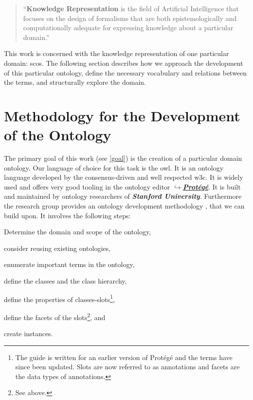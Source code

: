 \documentclass[a4paper, DIV=13, BCOR=0cm]{scrbook}
\newcommand{\pn}[1]{\textit{\textbf{#1}}}
\newcommand{\link}[2]{\href{#1}{$\hookrightarrow$#2}}
\begin{document}
\begin{quote}
	\enquote{\textbf{Knowledge Representation} is the field of Artificial Intelligence that focuses on the design of formalisms that are both epistemologically and computationally adequate for expressing knowledge about a particular domain.} \cite[p.\,XV, Preface]{baader2017introduction}
\end{quote}

This work is concerned with the knowledge representation of one particular domain: \glspl{sco}. The following section describes how we approach the development of this particular ontology, define the necessary vocabulary and relations between the terms, and structurally explore the domain.

\section{Methodology for the Development of the Ontology }
\label{methodology}
The primary goal of this work (see \autoref{goal}) is the creation of a particular domain ontology. Our language of choice for this task is the \gls{owl}. It is an ontology language developed by the consensus-driven and well respected \gls{w3c}. \cite[p.\,206]{baader2017introduction} It is widely used and offers very good tooling in the ontology editor \link{https://protege.stanford.edu}{\pn{Protégé}}. It is built and maintained by ontology researchers of \pn{Stanford University}. \cite{musen2015protege} Furthermore the research group provides an ontology development methodology \cite{guide-to-ontology}, that we can build upon. It involves the following steps:
\begin{compactenum}[(1)]
	\item Determine the domain and scope of the ontology,
	\item consider reusing existing ontologies,
	\item enumerate important terms in the ontology,
	\item define the classes and the class hierarchy,
	\item define the properties of classes-slots\footnote{The guide is written for an earlier version of Protégé and the terms have since been updated. Slots are now referred to as annotations and facets are the data types of annotations.},
	\item define the facets of the slots\footnote{See above.}, and
	\item create instances.
\end{compactenum}
\end{document}
